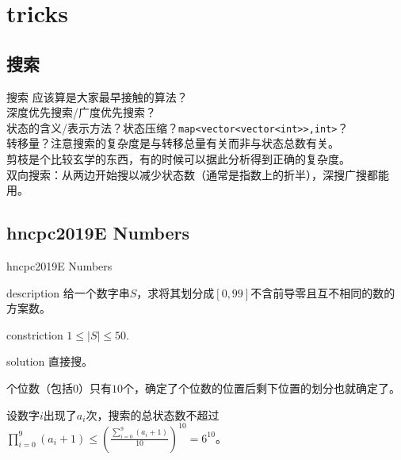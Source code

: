 \documentclass{beamer}
\begin{document}
	\section{tricks}
	\subsection{搜索}
	\begin{frame}{搜索}
		应该算是大家最早接触的算法？\pause\\
		
		深度优先搜索/广度优先搜索？\pause\\
		
		状态的含义/表示方法？状态压缩？\texttt{map<vector<vector<int>>,int>}？\pause\\
		
		转移量？注意搜索的复杂度是与转移总量有关而非与状态总数有关。\pause\\
		
		剪枝是个比较玄学的东西，有的时候可以据此分析得到正确的复杂度。\pause\\
		
		双向搜索：从两边开始搜以减少状态数（通常是指数上的折半），深搜广搜都能用。
	\end{frame}
	\subsection{hncpc2019E Numbers}
	\begin{frame}{hncpc2019E Numbers}
		\begin{block}{description}
			给一个数字串$S$，求将其划分成$[0,99]$不含前导零且互不相同的数的方案数。
		\end{block}
		\begin{block}{constriction}
			$1 \le |S| \le 50.$
		\end{block}
		\pause
		\begin{block}{solution}
			直接搜。
			
			个位数（包括$0$）只有$10$个，确定了个位数的位置后剩下位置的划分也就确定了。
			
			设数字$i$出现了$a_i$次，搜索的总状态数不超过$\prod_{i=0}^9(a_i+1) \le (\frac{\sum_{i=0}^9(a_i+1)}{10})^{10}=6^{10}$。
		\end{block}
	\end{frame}
\end{document}
